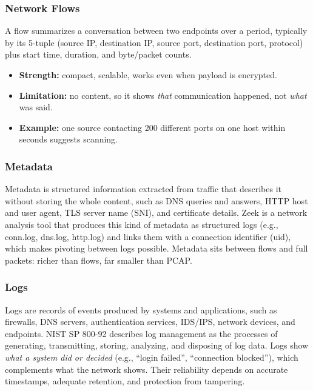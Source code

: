 \subsubsection{Network Flows}

A flow summarizes a conversation between two endpoints over a period, typically by its 5-tuple (source IP, destination IP, source port, destination port, protocol) plus start time, duration, and byte/packet counts.
\begin{itemize}
  \item \textbf{Strength:} compact, scalable, works even when payload is encrypted.
  \item \textbf{Limitation:} no content, so it shows \emph{that} communication happened, not \emph{what} was said.
  \item \textbf{Example:} one source contacting 200 different ports on one host within seconds suggests scanning.
\end{itemize}

\subsubsection{Metadata}

Metadata is structured information extracted from traffic that describes it without storing the whole content, such as DNS queries and answers, HTTP host and user agent, TLS server name (SNI), and certificate details. Zeek is a network analysis tool that produces this kind of metadata as structured logs (e.g., conn.log, dns.log, http.log) and links them with a connection identifier (uid), which makes pivoting between logs possible. Metadata sits between flows and full packets: richer than flows, far smaller than PCAP.

\subsubsection{Logs}

Logs are records of events produced by systems and applications, such as firewalls, DNS servers, authentication services, IDS/IPS, network devices, and endpoints. NIST SP 800-92 describes log management as the processes of generating, transmitting, storing, analyzing, and disposing of log data. Logs show \emph{what a system did or decided} (e.g., ``login failed'', ``connection blocked''), which complements what the network shows. Their reliability depends on accurate timestamps, adequate retention, and protection from tampering.

